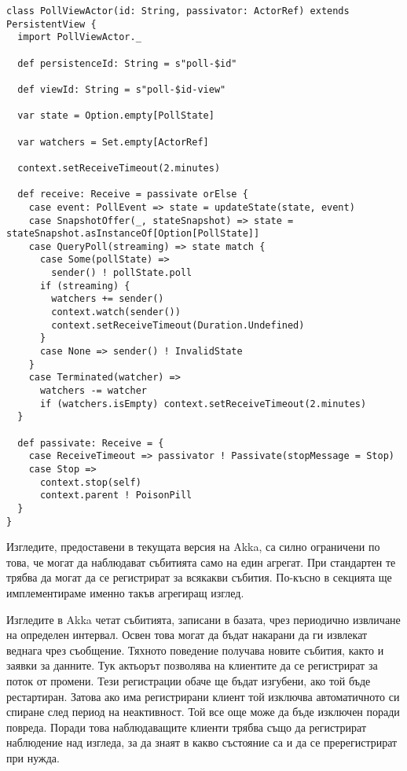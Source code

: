 \begin{lstlisting}[style=listing, caption={Изглед на анкета}]
class PollViewActor(id: String, passivator: ActorRef) extends PersistentView {
  import PollViewActor._
  
  def persistenceId: String = s"poll-$id"
  
  def viewId: String = s"poll-$id-view"
  
  var state = Option.empty[PollState]
  
  var watchers = Set.empty[ActorRef]
  
  context.setReceiveTimeout(2.minutes)
  
  def receive: Receive = passivate orElse {
    case event: PollEvent => state = updateState(state, event)
    case SnapshotOffer(_, stateSnapshot) => state = stateSnapshot.asInstanceOf[Option[PollState]]
    case QueryPoll(streaming) => state match {
      case Some(pollState) =>
        sender() ! pollState.poll
      if (streaming) {
        watchers += sender()
        context.watch(sender())
        context.setReceiveTimeout(Duration.Undefined)
      }
      case None => sender() ! InvalidState
    }
    case Terminated(watcher) =>
      watchers -= watcher
      if (watchers.isEmpty) context.setReceiveTimeout(2.minutes)
  }
  
  def passivate: Receive = {
    case ReceiveTimeout => passivator ! Passivate(stopMessage = Stop)
    case Stop =>
      context.stop(self)
      context.parent ! PoisonPill
  }
}
\end{lstlisting}

Изгледите, предоставени в текущата версия на Akka, са силно ограничени по това, че могат да наблюдават събитията само на един агрегат. При стандартен  те трябва да могат да се регистрират за всякакви събития. По-късно в секцията ще имплементираме именно такъв агрегиращ изглед.

Изгледите в Akka четат събитията, записани в базата, чрез периодично извличане на определен интервал. Освен това могат да бъдат накарани да ги извлекат веднага чрез  съобщение. Тяхното  поведение получава новите събития, както и заявки за данните. Тук актьорът позволява на клиентите да се регистрират за поток от промени. Тези регистрации обаче ще бъдат изгубени, ако той бъде рестартиран. Затова ако има регистрирани клиент той изключва автоматичното си спиране след период на неактивност. Той все още може да бъде изключен поради повреда. Поради това наблюдаващите клиенти трябва също да регистрират  наблюдение над изгледа, за да знаят в какво състояние са и да се пререгистрират при нужда.

